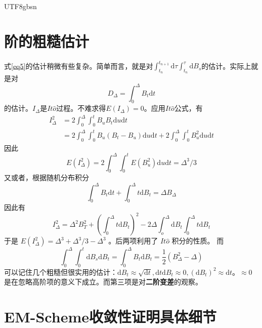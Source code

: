 \documentclass{article}
\begin{document}
\begin{CJK*}{UTF8}{gbsn}
\appendix
\section{阶的粗糙估计\label{AppendixA}}
式\ref{eq5}的估计稍微有些复杂。简单而言，就是对$\int_{t_n}^{t_{n+1}}\mathrm{d}\tau\int_{t_n}^\tau\mathrm{d}B_s$的估计。实际上就是对
$$
D_\Delta=\int_{0}^{\Delta} B_t\mathrm{d}t
$$
的估计。$I_\Delta$是$It\hat{o}$过程。不难求得$E(I_\Delta)=0$。应用$It\hat{o}$公式，有
$$\begin{aligned}
I_\Delta^2
&=2\int_0^\Delta\int_0^tB_uB_t\mathrm{d}u\mathrm{d}t\\
&=2\int^\Delta_0\int_0^t B_u(B_t-B_u)\mathrm{d}u\mathrm{d}t+2\int^\Delta_0\int_0^t B_u^2\mathrm{d}u\mathrm{d}t
\end{aligned}$$
因此
$$
E(I_\Delta^2)=2\int^\Delta_0\int_0^t E(B_u^2)\mathrm{d}u\mathrm{d}t=\Delta^3/3
$$
又或者，根据随机分布积分
$$
\int_0^\Delta B_t\mathrm{d}t+\int_0^\Delta t\mathrm{d}B_t=\Delta B_\Delta
$$
因此有
$$
I_\Delta^2=\Delta^2B_T^2+(\int_0^\Delta t\mathrm{d}B_t)^2-2\Delta\int_o^\Delta\mathrm{d}B_t\int_0^\Delta t\mathrm{d}B_t
$$
于是 $E(I_\Delta^2)=\Delta^3+\Delta^3/3-\Delta^3$ 。后两项利用了 $It\hat{o}$ 积分的性质。
而
$$
\int_0^\Delta\int_0^t\mathrm{d}B_s\mathrm{d}B_t=\int_0^\Delta B_t\mathrm{d}B_t=\frac{1}{2}(B_\Delta^2-\Delta)
$$
可以记住几个粗糙但很实用的估计：$\mathrm{d}B_t\approx\sqrt{\mathrm{d}t},\mathrm{d}t\mathrm{d}B_t\approx0,(\mathrm{d}B_t)^2\approx\mathrm{d}t$。$\approx0$是在忽略高阶项的意义下成立。而第三项是对\textbf{二阶变差}的观察。

\section{EM-Scheme收敛性证明具体细节\label{appendixB}}

\end{CJK*}
\end{document}
